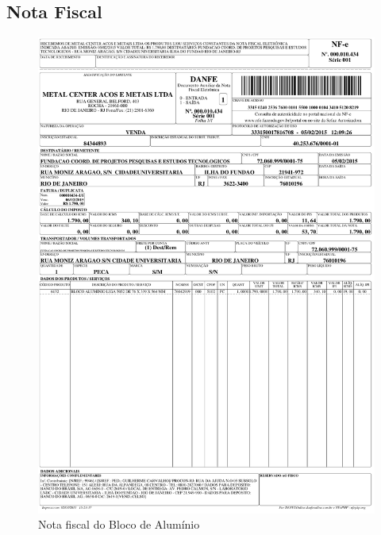 \subsection{Nota Fiscal}
\begin{figure}[H]
 \centering
 \includegraphics[width=0.9\columnwidth]{Aluminio/nota.pdf}
 \caption{Nota fiscal do Bloco de Alumínio}
 \end{figure}